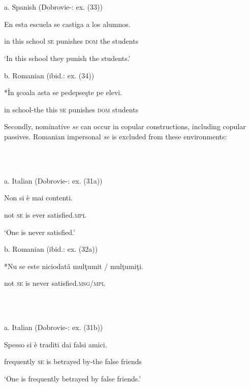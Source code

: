 \documentclass[output=paper]{langsci/langscibook}
\begin{document}
\ea%
    \label{ex:key:6}
    \gll\\
        \\
    \glt
    \z

          a.   Spanish (Dobrovie-\citealt{Sorin2017}: ex. (33))

En esta escuela se castiga     a       los alumnos.

        in   this school  \textsc{se} punishes  \textsc{dom} the students

        ‘In this school they punish the students.’   

  b.   Romanian (ibid.: ex. (34))

*În şcoala       asta se pedepseşte pe     elevi.

          in school-the this \textsc{se} punishes    \textsc{dom}  students    

\begin{styleDSb}
Secondly, nominative \textit{se} can occur in copular constructions, including copular passives. Romanian impersonal \textit{se} is excluded from these environments:
\end{styleDSb}

\ea%
    \label{ex:key:7}
    \gll\\
        \\
    \glt
    \z

          a.   Italian (Dobrovie-\citealt{Sorin2017}: ex. (31a))

Non si   è  mai contenti.

        not  \textsc{se}  is ever satisfied.\textsc{mpl}

        ‘One is never satisfied.’    

b.   Romanian (ibid.: ex. (32a))

*Nu se este niciodatǎ mulţumit / mulţumiţi.

          not \textsc{se} is    never       satisfied.\textsc{msg/mpl} 

\ea%
    \label{ex:key:8}
    \gll\\
        \\
    \glt
    \z

          a.   Italian (Dobrovie-\citealt{Sorin2017}: ex. (31b))

Spesso      si  è  traditi     dai      falsi  amici. 

        frequently \textsc{se} is betrayed by-the false friends

        ‘One is frequently betrayed by false friends.’   
\end{document}
